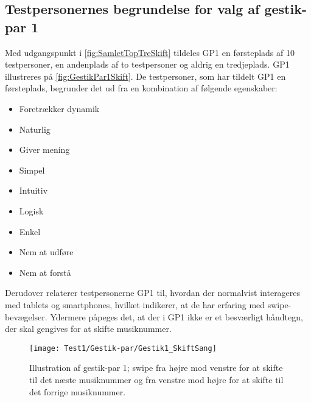 \subsection{Testpersonernes begrundelse for valg af gestik-par 1}
\label{TestresultaterValgAfGestikkerBegrundelseGP1Skift}
%
Med udgangspunkt i \autoref{fig:SamletTopTreSkift} tildeles GP1 en førsteplads af 10 testpersoner, en andenplads af to testpersoner og aldrig en tredjeplads. GP1 illustreres på \autoref{fig:GestikPar1Skift}. De testpersoner, som har tildelt GP1 en førsteplads, begrunder det ud fra en kombination af følgende egenskaber: 
%
\begin{multicols}{3}
    \begin{itemize}
        \item Foretrækker dynamik
        \item Naturlig
        \item Giver mening
        \item Simpel
        \item Intuitiv
        \item Logisk
        \item Enkel
        \item Nem at udføre
        \item Nem at forstå
\end{itemize}
\end{multicols}
\noindent
%
Derudover relaterer testpersonerne GP1 til, hvordan der normalvist interageres med tablets og smartphones, hvilket indikerer, at de har erfaring med swipe-bevægelser. Ydermere påpeges det, at der i GP1 ikke er et besværligt håndtegn, der skal gengives for at skifte musiknummer.
%
\begin{figure}[H]
	\centering
	\texttt{[image: Test1/Gestik-par/Gestik1\_SkiftSang]}
	\caption{Illustration af gestik-par 1; swipe fra højre mod venstre for at skifte til det næste musiknummer og fra venstre mod højre for at skifte til det forrige musiknummer.}
	\label{fig:GestikPar1Skift}
\end{figure}
\noindent
%
